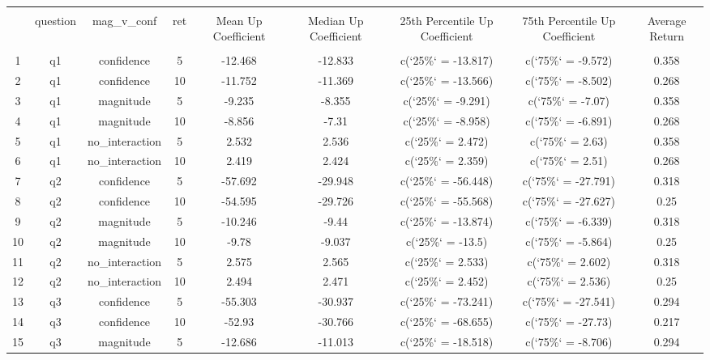 
\begin{table}[!htbp] \centering 
  \caption{} 
  \label{} 
\begin{tabular}{@{\extracolsep{5pt}} ccccccccc} 
\\[-1.8ex]\hline 
\hline \\[-1.8ex] 
 & question & mag\_v\_conf & ret & Mean Up Coefficient & Median Up Coefficient & 25th Percentile Up Coefficient & 75th Percentile Up Coefficient & Average Return \\ 
\hline \\[-1.8ex] 
1 & q1 & confidence & 5 & -12.468 & -12.833 & c(`25\%` = -13.817) & c(`75\%` = -9.572) & 0.358 \\ 
2 & q1 & confidence & 10 & -11.752 & -11.369 & c(`25\%` = -13.566) & c(`75\%` = -8.502) & 0.268 \\ 
3 & q1 & magnitude & 5 & -9.235 & -8.355 & c(`25\%` = -9.291) & c(`75\%` = -7.07) & 0.358 \\ 
4 & q1 & magnitude & 10 & -8.856 & -7.31 & c(`25\%` = -8.958) & c(`75\%` = -6.891) & 0.268 \\ 
5 & q1 & no\_interaction & 5 & 2.532 & 2.536 & c(`25\%` = 2.472) & c(`75\%` = 2.63) & 0.358 \\ 
6 & q1 & no\_interaction & 10 & 2.419 & 2.424 & c(`25\%` = 2.359) & c(`75\%` = 2.51) & 0.268 \\ 
7 & q2 & confidence & 5 & -57.692 & -29.948 & c(`25\%` = -56.448) & c(`75\%` = -27.791) & 0.318 \\ 
8 & q2 & confidence & 10 & -54.595 & -29.726 & c(`25\%` = -55.568) & c(`75\%` = -27.627) & 0.25 \\ 
9 & q2 & magnitude & 5 & -10.246 & -9.44 & c(`25\%` = -13.874) & c(`75\%` = -6.339) & 0.318 \\ 
10 & q2 & magnitude & 10 & -9.78 & -9.037 & c(`25\%` = -13.5) & c(`75\%` = -5.864) & 0.25 \\ 
11 & q2 & no\_interaction & 5 & 2.575 & 2.565 & c(`25\%` = 2.533) & c(`75\%` = 2.602) & 0.318 \\ 
12 & q2 & no\_interaction & 10 & 2.494 & 2.471 & c(`25\%` = 2.452) & c(`75\%` = 2.536) & 0.25 \\ 
13 & q3 & confidence & 5 & -55.303 & -30.937 & c(`25\%` = -73.241) & c(`75\%` = -27.541) & 0.294 \\ 
14 & q3 & confidence & 10 & -52.93 & -30.766 & c(`25\%` = -68.655) & c(`75\%` = -27.73) & 0.217 \\ 
15 & q3 & magnitude & 5 & -12.686 & -11.013 & c(`25\%` = -18.518) & c(`75\%` = -8.706) & 0.294 \\ 

\end{tabular}
\end{table}
